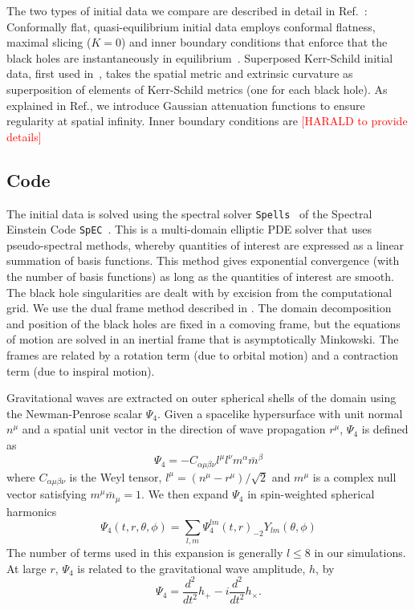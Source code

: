 \documentclass[aps,prd,amsmath,floatfix,twocolumn,superscriptaddress,nofootinbib,showpacs]{revtex4-1}
\theoremstyle{plain}
\theoremstyle{definition}
\newcommand{\red}[1]{\textcolor{Red}{#1}}
\begin{document}
The two types of initial data we compare are described in detail in
Ref.~\cite{Lovelace2008}: Conformally flat, quasi-equilibrium initial
data employs conformal flatness, maximal slicing ($K=0$) and inner
boundary conditions that enforce that the black holes are
instantaneously in
equilibrium~\cite{Caudill-etal:2006,Cook2004,Cook2002}.  Superposed
Kerr-Schild initial data, first used
in~\cite{Marronetti-Matzner:2000,Matzner1999}, takes the spatial
metric and extrinsic curvature as superposition of elements of
Kerr-Schild metrics (one for each black hole).  As explained in
Ref.\cite{Lovelace2008}, we introduce Gaussian attenuation functions
to ensure regularity at spatial infinity.  Inner boundary conditions
are \red{[HARALD to provide details]} 



\subsection{Code}
\label{sec:Code}

The initial data is solved using the spectral solver {\tt Spells}~\cite{Pfeiffer2003} of the Spectral 
 Einstein Code {\tt SpEC}~\cite{SpECwebsite}.  This is a
multi-domain elliptic PDE solver that uses pseudo-spectral methods,
whereby quantities of interest are expressed as a linear summation of
basis functions. This method gives exponential convergence (with the
number of basis functions) as long as the quantities of interest are
smooth. The black hole singularities are dealt with by excision from
the computational grid. We use the dual frame method described in
\cite{Scheel2006}. The domain decomposition and position of the black
holes are fixed in a comoving frame, but the equations of motion are
solved in an inertial frame that is asymptotically Minkowski. The
frames are related by a rotation term (due to orbital motion) and a
contraction term (due to inspiral motion).

Gravitational waves are extracted on outer spherical shells of the
domain using the Newman-Penrose scalar $\Psi_4$. Given a spacelike
hypersurface with unit normal $n^{\mu}$ and a spatial unit vector in
the direction of wave propagation $r^{\mu}$, $\Psi_4$ is defined as 
\begin{equation}
\Psi_4 = -C_{\alpha\mu\beta\nu}l^{\mu}l^{\nu}m^{\alpha}\bar{m}^{\beta}
\end{equation}
where $C_{\alpha\mu\beta\nu}$ is the Weyl tensor,
$l^{\mu}=\left(n^{\mu}-r^{\mu}\right)/\sqrt{2}$ and $m^{\mu}$ is a
complex null vector satisfying $m^{\mu}\bar{m}_{\mu}=1$. We then expand
$\Psi_4$ in spin-weighted spherical harmonics
\begin{equation}
\Psi_4(t,r,\theta,\phi)=\sum_{l,m}{\Psi_4^{lm}(t,r)_{-2}Y_{lm}(\theta,\phi)}
\end{equation}
The number of terms used in this expansion is generally $l\le 8$ in
our simulations. At large $r$, $\Psi_4$ is related to the
gravitational wave amplitude, $h$, by
\begin{equation}
\Psi_4=\frac{d^2}{dt^2}h_{+}-i\frac{d^2}{dt^2}h_{\times}.
\end{equation}
\end{document}
